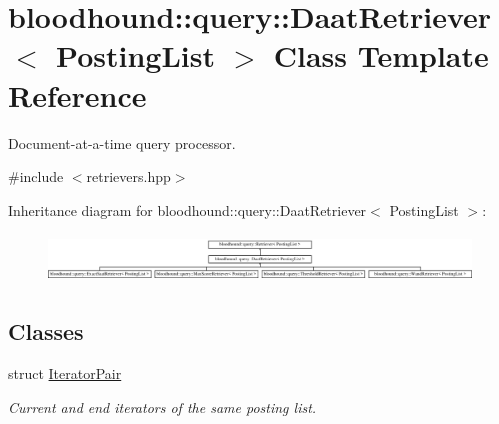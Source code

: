 \hypertarget{classbloodhound_1_1query_1_1DaatRetriever}{}\section{bloodhound\+:\+:query\+:\+:Daat\+Retriever$<$ Posting\+List $>$ Class Template Reference}
\label{classbloodhound_1_1query_1_1DaatRetriever}


Document-\/at-\/a-\/time query processor.  




{\ttfamily \#include $<$retrievers.\+hpp$>$}

Inheritance diagram for bloodhound\+:\+:query\+:\+:Daat\+Retriever$<$ Posting\+List $>$\+:\begin{figure}[H]
\begin{center}
\leavevmode
\includegraphics[height=1.296296cm]{classbloodhound_1_1query_1_1DaatRetriever}
\end{center}
\end{figure}
\subsection*{Classes}
\begin{DoxyCompactItemize}
\item 
struct \hyperlink{structbloodhound_1_1query_1_1DaatRetriever_1_1IteratorPair}{Iterator\+Pair}
\begin{DoxyCompactList}\small\item\em Current and end iterators of the same posting list. \end{DoxyCompactList}\end{DoxyCompactItemize}
